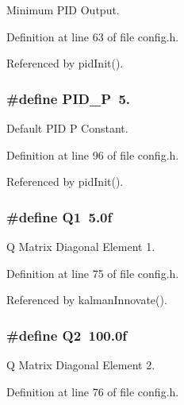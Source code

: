 Minimum P\-I\-D Output. 



Definition at line 63 of file config.\-h.



Referenced by pid\-Init().

\hypertarget{group__config_gab3ea7c9a4399d8844727806c960880ad}{
\subsubsection[{P\-I\-D\-\_\-\-P}]{\setlength{\rightskip}{0pt plus 5cm}\#define P\-I\-D\-\_\-\-P~5.}}\label{group__config_gab3ea7c9a4399d8844727806c960880ad}


Default P\-I\-D P Constant. 



Definition at line 96 of file config.\-h.



Referenced by pid\-Init().

\hypertarget{group__config_ga0f32727853a3ac3d848701803c3b8688}{
\subsubsection[{Q1}]{\setlength{\rightskip}{0pt plus 5cm}\#define Q1~5.\-0f}}\label{group__config_ga0f32727853a3ac3d848701803c3b8688}


Q Matrix Diagonal Element 1. 



Definition at line 75 of file config.\-h.



Referenced by kalman\-Innovate().

\hypertarget{group__config_gaf5bca4c32f8c6886a3d8c526d2e3e9a7}{
\subsubsection[{Q2}]{\setlength{\rightskip}{0pt plus 5cm}\#define Q2~100.\-0f}}\label{group__config_gaf5bca4c32f8c6886a3d8c526d2e3e9a7}


Q Matrix Diagonal Element 2. 



Definition at line 76 of file config.\-h.




